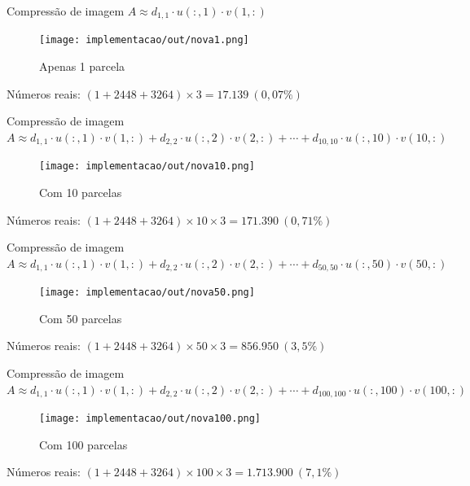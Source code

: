 \documentclass{beamer}
\begin{document}
\begin{frame}{Compress\~ao de imagem}{
    $A \approx d_{1,1}\cdot u(:,1)\cdot v(1,:)$}
    \pause
    \begin{figure}
        \centering
        \texttt{[image: implementacao/out/nova1.png]}
        \caption{Apenas 1 parcela}
    \end{figure}
    \begin{center}
        N\'umeros reais: $(1 + 2448 + 3264) \times 3 = 17.139\ (0,07\%)$
    \end{center}
\end{frame}

\begin{frame}{Compress\~ao de imagem}{
    $A \approx d_{1,1}\cdot u(:,1)\cdot v(1,:) + d_{2,2}\cdot
    u(:,2)\cdot v(2,:) +\cdots+ d_{10,10}\cdot u(:,10)\cdot v(10,:)$}
    \pause
    \begin{figure}
        \centering
        \texttt{[image: implementacao/out/nova10.png]}
        \caption{Com 10 parcelas}
    \end{figure}
    \begin{center}
        N\'umeros reais: $(1 + 2448 + 3264)\times 10 \times 3 = 171.390\ (0,71\%)$
    \end{center}
\end{frame}

\begin{frame}{Compress\~ao de imagem}{
    $A \approx d_{1,1}\cdot u(:,1)\cdot v(1,:) + d_{2,2}\cdot
    u(:,2)\cdot v(2,:) +\cdots+ d_{50,50}\cdot u(:,50)\cdot v(50,:)$}
    \pause
    \begin{figure}
        \centering
        \texttt{[image: implementacao/out/nova50.png]}
        \caption{Com 50 parcelas}
    \end{figure}
    \begin{center}
        N\'umeros reais: $(1 + 2448 + 3264)\times 50 \times 3 = 856.950\ (3,5\%)$
    \end{center}
\end{frame}

\begin{frame}{Compress\~ao de imagem}{
    $A \approx d_{1,1}\cdot u(:,1)\cdot v(1,:) + d_{2,2}\cdot
    u(:,2)\cdot v(2,:) +\cdots+ d_{100,100}\cdot u(:,100)\cdot v(100,:)$}
    \pause
    \begin{figure}
        \centering
        \texttt{[image: implementacao/out/nova100.png]}
        \caption{Com 100 parcelas}
    \end{figure}
    \begin{center}
        N\'umeros reais: $(1 + 2448 + 3264)\times 100 \times 3 = 1.713.900\ (7,1\%)$
    \end{center}
\end{frame}
\end{document}
